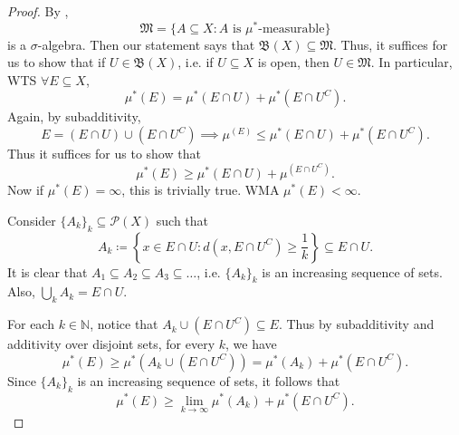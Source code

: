\documentclass[notoc,notitlepage]{tufte-book}
\begin{document}
\begin{proof}
  By ,
  \begin{equation*}
    \mathfrak{M} = \{ A \subseteq X : A \text{ is } \mu^*\text{-measurable} \}
  \end{equation*}
  is a $\sigma$-algebra.
  Then our statement says that $\mathfrak{B}(X) \subseteq \mathfrak{M}$.
  Thus, it suffices for us to show that if $U \in \mathfrak{B}(X)$,
  i.e. if $U \subseteq X$ is open, then $U \in \mathfrak{M}$.
  In particular, WTS $\forall E \subseteq X$,
  \begin{equation*}
    \mu^*(E) = \mu^*(E \cap U) + \mu^*(E \cap U^C).
  \end{equation*}
  Again, by subadditivity,
  \begin{equation*}
    E = (E \cap U) \cup (E \cap U^C) \implies
    \mu^(E) \leq \mu^*(E \cap U) + \mu^*(E \cap U^C).
  \end{equation*}
  Thus it suffices for us to show that
  \begin{equation*}
    \mu^*(E) \geq \mu^*(E \cap U) + \mu^(E \cap U^C).
  \end{equation*}
  Now if $\mu^*(E) = \infty$, this is trivially true.
  WMA $\mu^*(E) < \infty$.

  Consider $\{ A_k \}_{k} \subseteq \mathcal{P}(X)$ such that
  \begin{equation*}
    A_k \coloneqq \left\{ x \in E \cap U
      : d(x, E \cap U^C) \geq \frac{1}{k} \right\} \subseteq E \cap U.
  \end{equation*}
  It is clear that $A_1 \subseteq A_2 \subseteq A_3 \subseteq \hdots$,
  i.e. $\{ A_k \}_k$ is an increasing sequence of sets.
  Also, $\bigcup_{k} A_k = E \cap U$.

  For each $k \in \mathbb{N}$, notice that
  $A_k \cup (E \cap U^C) \subseteq E$.
  Thus by subadditivity and additivity over disjoint sets,
  for every $k$, we have
  \begin{equation*}
    \mu^*(E) \geq \mu^*(A_k \cup (E \cap U^C)) = \mu^*(A_k) + \mu^*(E \cap U^C).
  \end{equation*}
  Since $\{ A_k \}_k$ is an increasing sequence of sets, it follows that
  \begin{equation*}
    \mu^*(E) \geq \lim_{k \to \infty} \mu^*(A_k) + \mu^*(E \cap U^C).
  \end{equation*}


\end{proof}
\end{document}
